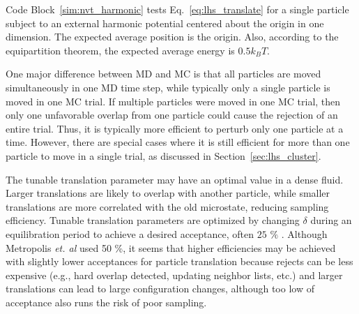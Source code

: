 \documentclass[
  9pt,
  bestpractices,
]{livecoms}
\begin{document}
\begin{figure}

\end{figure}

Code Block~\ref{sim:nvt_harmonic} tests Eq.~\ref{eq:lhs_translate} for a single particle subject to an external harmonic potential centered about the origin in one dimension.
The expected average position is the origin.
Also, according to the equipartition theorem, the expected average energy is $0.5k_BT$.

One major difference between MD and MC is that all particles are moved simultaneously in one MD time step, while typically only a single particle is moved in one MC trial.
If multiple particles were moved in one MC trial, then only one unfavorable overlap from one particle could cause the rejection of an entire trial.
Thus, it is typically more efficient to perturb only one particle at a time.
However, there are special cases where it is still efficient for more than one particle to move in a single trial, as discussed in Section~\ref{sec:lhs_cluster}.

The tunable translation parameter may have an optimal value in a dense fluid.
Larger translations are likely to overlap with another particle, while smaller translations are more correlated with the old microstate, reducing sampling efficiency.
Tunable translation parameters are optimized by changing $\delta$ during an equilibration period to achieve a desired acceptance, often $25$ $\%$ \cite{kolafa_optimization_1987, jacucci_comparing_1984, chapman_metropolis_1985, mountain_quantative_1994, hatch_parallel_2020}.
Although Metropolis \textit{et. al} \cite{metropolis_equation_1953} used 50 \%, it seems that higher efficiencies may be achieved with slightly lower acceptances for particle translation because rejects can be less expensive (e.g., hard overlap detected, updating neighbor lists, etc.) and larger translations can lead to large configuration changes, although too low of acceptance also runs the risk of poor sampling.
\end{document}
